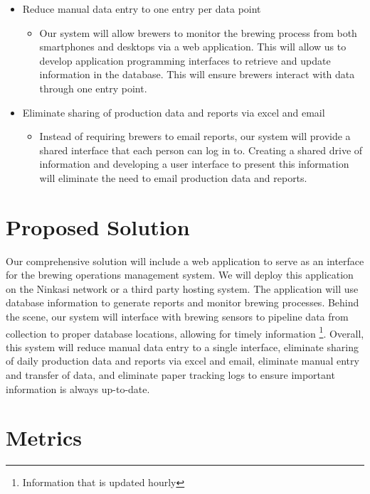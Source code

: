 \documentclass[draftclsnofoot,onecolumn,letterpaper,10pt]{IEEEtran}
\begin{document}
\begin{itemize}

	\item {Reduce manual data entry to one entry per data point}
		\begin{itemize}
			\item {Our system will allow brewers to monitor the brewing process from both smartphones and desktops via a web application.
			This will allow us to develop application programming interfaces to retrieve and update information in the database.
			This will ensure brewers interact with data through one entry point.}
		\end{itemize}


	\item {Eliminate sharing of production data and reports via excel and email}
	    \begin{itemize}
			\item {
			Instead of requiring brewers to email reports, our system will provide a shared interface that each person can log in to.
			Creating a shared drive of information and developing a user interface to present this information will eliminate the need to email production data and reports.}
			\end{itemize}
\end{itemize}

\section{Proposed Solution}
Our comprehensive solution will include a web application to serve as an interface for the brewing operations management system.
We will deploy this application on the Ninkasi network or a third party hosting system.
The application will use database information to generate reports and monitor brewing processes.
Behind the scene, our system will interface with brewing sensors to pipeline data from collection to proper database locations, allowing for timely information \footnote{Information that is updated hourly}.
Overall, this system will reduce manual data entry to a single interface, eliminate sharing of daily production data and reports via excel and email, eliminate manual entry and transfer of data, and eliminate paper tracking logs to ensure important information is always up-to-date.

\section{Metrics}
\end{document}
